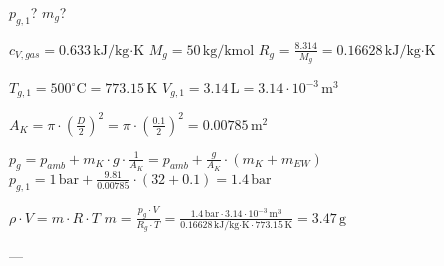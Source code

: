 \( p_{g,1} \)?  
\( m_g \)?  

\( c_{V,gas} = 0.633 \, \text{kJ/kg·K} \)  
\( M_g = 50 \, \text{kg/kmol} \)  
\( R_g = \frac{8.314}{M_g} = 0.16628 \, \text{kJ/kg·K} \)  

\( T_{g,1} = 500^\circ \text{C} = 773.15 \, \text{K} \)  
\( V_{g,1} = 3.14 \, \text{L} = 3.14 \cdot 10^{-3} \, \text{m}^3 \)  

\( A_K = \pi \cdot \left(\frac{D}{2}\right)^2 = \pi \cdot \left(\frac{0.1}{2}\right)^2 = 0.00785 \, \text{m}^2 \)  

\( p_g = p_{amb} + m_K \cdot g \cdot \frac{1}{A_K} = p_{amb} + \frac{g}{A_K} \cdot (m_K + m_{EW}) \)  
\( p_{g,1} = 1 \, \text{bar} + \frac{9.81}{0.00785} \cdot (32 + 0.1) = 1.4 \, \text{bar} \)  

\( \rho \cdot V = m \cdot R \cdot T \)  
\( m = \frac{p_g \cdot V}{R_g \cdot T} = \frac{1.4 \, \text{bar} \cdot 3.14 \cdot 10^{-3} \, \text{m}^3}{0.16628 \, \text{kJ/kg·K} \cdot 773.15 \, \text{K}} = 3.47 \, \text{g} \)  

---